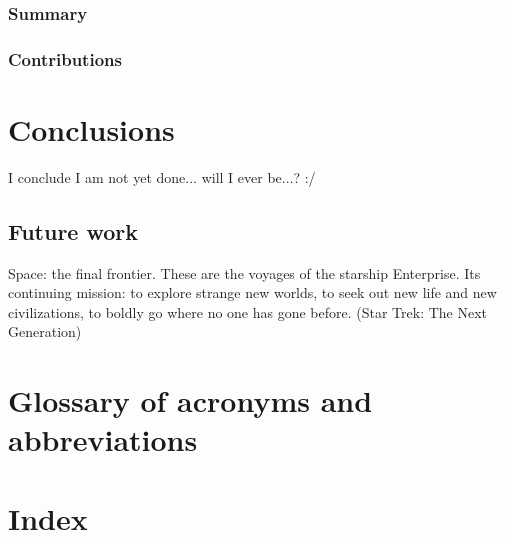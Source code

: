 \documentclass[showtrims]{kthesis}
\newcommand*\VerBar[1]{%
	\begin{tikzpicture}
	\fill[#1] (0,0)--(1,0)--(1,1)--(0,1)--cycle;
	\draw[white] (0.5,0.5)node{\rotatebox{-90}{\Huge \textbf \thechapter}};
	\end{tikzpicture}
}
\newcounter{DogearHShift}
\newcommand{\dogear}[1]{%
  \backgroundsetup{position={current page.north east},vshift=0.5cm,%
    hshift=-\theDogearHShift cm,contents={\VerBar{#1}}}%
  \BgThispage%
  \addtocounter{DogearHShift}{1}
}
\newcommand{\dogearRGB}[1]{%
  \definecolor{dogearColor}{RGB}{#1}%
  \dogear{dogearColor}%
}
\begin{document}
\subsection{Summary}
\subsection{Contributions}


\chapter{Conclusions}
\renewcommand\thesection{\thechapter.\arabic{section}}
I conclude I am not yet done... will I ever be...? :/

\section{Future work}
Space: the final frontier. These are the voyages of the starship Enterprise. Its 
continuing mission: to explore strange new worlds, to seek out new life and new 
civilizations, to boldly go where no one has gone before. (Star Trek: The Next Generation)


\chapter{Glossary of acronyms and abbreviations}
\printacronyms

\chapter{Index}




\end{document}
